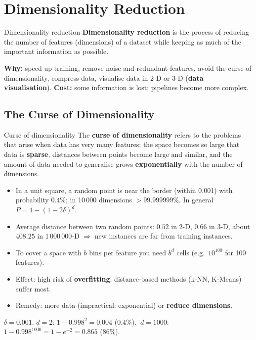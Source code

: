 \chapter{Dimensionality Reduction}\label{n:dimred}

\begin{dfn}{Dimensionality reduction}
\textbf{Dimensionality reduction} is the process of reducing the number of features (dimensions) of a dataset while keeping as much of the important information as possible.
\end{dfn}
\textbf{Why:} speed up training, remove noise and redundant features, avoid the curse of dimensionality, compress data, visualise data in 2-D or 3-D (\textbf{data visualisation}). \textbf{Cost:} some information is lost; pipelines become more complex.

\section{The Curse of Dimensionality}
\begin{dfn}{Curse of dimensionality}
The \textbf{curse of dimensionality} refers to the problems that arise when data has very many features: the space becomes so large that data is \textbf{sparse}, distances between points become large and similar, and the amount of data needed to generalise grows \textbf{exponentially} with the number of dimensions.
\end{dfn}
\begin{itemize}
  \item In a unit square, a random point is near the border (within 0.001) with probability $0.4\%$; in 10\,000 dimensions $>99.999999\%$. In general $P=1-(1-2\delta)^d$.
  \item Average distance between two random points: $0.52$ in 2-D, $0.66$ in 3-D, about $408.25$ in 1\,000\,000-D $\Rightarrow$ new instances are far from training instances.
  \item To cover a space with $b$ bins per feature you need $b^d$ cells (e.g.\ $10^{100}$ for 100 features).
  \item Effect: high risk of \textbf{overfitting}; distance-based methods (k-NN, K-Means) suffer most.
  \item Remedy: more data (impractical: exponential) or \textbf{reduce dimensions}.
\end{itemize}
\begin{numer}
$\delta=0.001$. $d=2$: $1-0.998^2=0.004$ (0.4\%). $\ d=1000$: $1-0.998^{1000}=1-e^{-2}=\mathbf{0.865}$ (86\%).
\end{numer}

